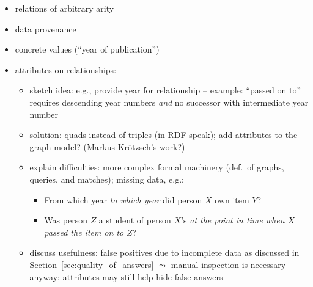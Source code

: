 %
\begin{itemize}
  \item
    relations of arbitrary arity
  \item
    data provenance
  \item
    concrete values (\enquote{year of publication})
  \item
    attributes on relationships:
    \begin{itemize}
      \item
        sketch idea: e.g., provide year for relationship  -- example: \enquote{passed on to} requires descending year numbers \emph{and} no successor with intermediate year number
      \item
        solution: quads instead of triples (in RDF speak); add attributes to the graph model? (Markus Krötzsch's work?)
      \item
        explain difficulties: more complex formal machinery (def.\ of graphs, queries, and matches); missing data, e.g.:
        \begin{itemize}
          \item
            From which year \emph{to which year} did person $X$ own item $Y$?
          \item
            Was person $Z$ a student of person $X$'s \emph{at the point in time when $X$ passed the item on to $Z$}?
        \end{itemize}
      \item
        discuss usefulness: false positives due to incomplete data as discussed in Section~\ref{sec:quality_of_answers}
        $\leadsto$ manual inspection is necessary anyway; attributes may still help hide false answers
    \end{itemize}
\end{itemize}
